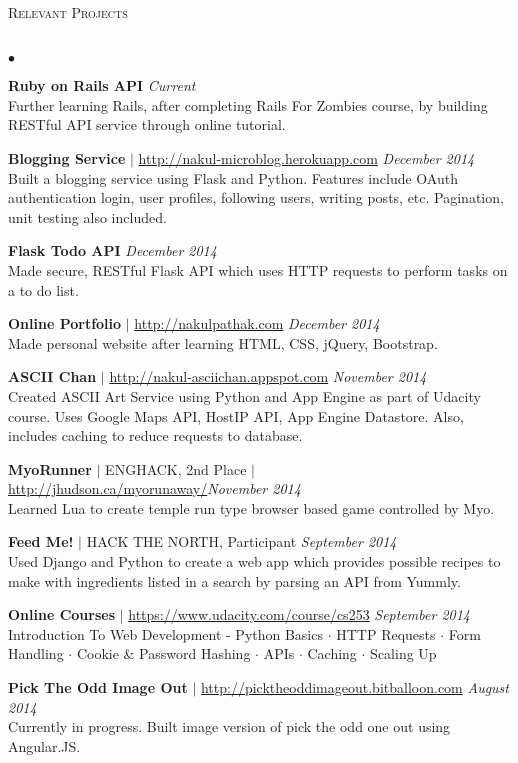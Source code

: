 \documentclass[10pt]{article}
\newcommand{\lineunder}{\vspace*{-8pt} \\ \hspace*{-18pt} \hrulefill \\}
\newcommand{\header}[1]{{\hspace*{-15pt}\vspace*{6pt} \textsc{#1}} \vspace*{-6pt} \lineunder}
\newenvironment{achievements}{\begin{list}{$\bullet$}{\topsep 0pt \itemsep -1.5pt \leftmargin 5pt}}{\vspace*{4pt}\end{list}}
\begin{document}
\header{\normalsize Relevant Projects}
\begin{achievements}
\def\UrlFont{\em}
\item \textbf{Ruby on Rails API} \hfill \textit {Current}
\\ Further learning Rails, after completing Rails For Zombies course, by building RESTful API service through online tutorial.
\item \textbf{Blogging Service} $|$ \url{http://nakul-microblog.herokuapp.com} \hfill \textit {December 2014}
\\ Built a blogging service using Flask and Python. Features include OAuth authentication login, user profiles, following users, writing posts, etc. Pagination, unit testing also included.
\item \textbf{Flask Todo API}  \hfill \textit {December 2014}
\\ Made secure, RESTful Flask API which uses HTTP requests to perform tasks on a to do list.
\item \textbf{Online Portfolio} $|$  \url{http://nakulpathak.com} \hfill \textit {December 2014}
\\ Made personal website after learning HTML, CSS, jQuery, Bootstrap.
\item \textbf{ASCII Chan}  $|$ \url{http://nakul-asciichan.appspot.com} \hfill \textit {November 2014}
\\ Created ASCII Art Service using Python and App Engine as part of Udacity course. Uses Google Maps API, HostIP API, App Engine Datastore. Also, includes caching to reduce requests to database. 
\item\textbf{MyoRunner}  {$|$ \scriptsize ENGHACK, 2nd Place $|$ }  \url{http://jhudson.ca/myorunaway/}\hfill \textit {November 2014}
\\ Learned Lua to create temple run type browser based game controlled by Myo.
\item \textbf{Feed Me!} {$|$ \scriptsize HACK THE NORTH, Participant}  \hfill \textit {September 2014}
\\ Used Django and Python to create a web app which provides possible recipes to make with ingredients listed in a search by parsing an API from Yummly.
\item \textbf{Online Courses} $|$ \url{https://www.udacity.com/course/cs253} \hfill \textit {September 2014}
\\ Introduction To Web Development - Python Basics $\cdot$ HTTP Requests  $\cdot$ Form Handling $\cdot$ Cookie \& Password Hashing $\cdot$ APIs $\cdot$ Caching $\cdot$ Scaling Up
\item \textbf{Pick The Odd Image Out} $|$ \url{http://picktheoddimageout.bitballoon.com} \hfill \textit{August 2014}
\\ Currently in progress. Built image version of pick the odd one out using Angular.JS. 
\end{achievements}
\end{document}
